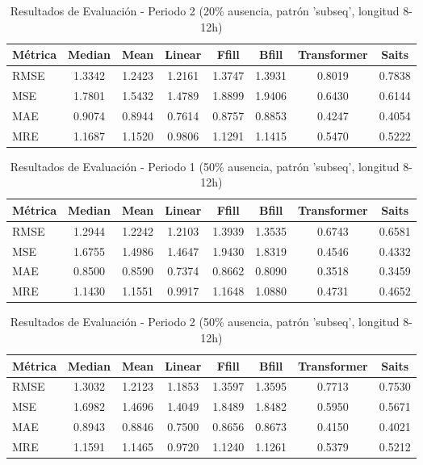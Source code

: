 \begin{table}[htbp]
\centering
\caption{Resultados de Evaluación - Periodo 2 (20\% ausencia, patrón 'subseq', longitud 8-12h)}
\label{tab:poqueira_20_subseq_per2}
\begin{tabular}{l*{7}{S[table-format=1.4]}}
\toprule
\textbf{Métrica} & \textbf{Median} & \textbf{Mean} & \textbf{Linear} & \textbf{Ffill} & \textbf{Bfill} & \textbf{Transformer} & \textbf{Saits} \\
\midrule
RMSE & 1.3342 & 1.2423 & 1.2161 & 1.3747 & 1.3931 & 0.8019 & 0.7838 \\
MSE  & 1.7801 & 1.5432 & 1.4789 & 1.8899 & 1.9406 & 0.6430 & 0.6144 \\
MAE  & 0.9074 & 0.8944 & 0.7614 & 0.8757 & 0.8853 & 0.4247 & 0.4054 \\
MRE  & 1.1687 & 1.1520 & 0.9806 & 1.1291 & 1.1415 & 0.5470 & 0.5222 \\
\bottomrule
\end{tabular}
\end{table}

\begin{table}[htbp]
\centering
\caption{Resultados de Evaluación - Periodo 1 (50\% ausencia, patrón 'subseq', longitud 8-12h)}
\label{tab:poqueira_50_subseq_per1}
\begin{tabular}{l*{7}{S[table-format=1.4]}}
\toprule
\textbf{Métrica} & \textbf{Median} & \textbf{Mean} & \textbf{Linear} & \textbf{Ffill} & \textbf{Bfill} & \textbf{Transformer} & \textbf{Saits} \\
\midrule
RMSE & 1.2944 & 1.2242 & 1.2103 & 1.3939 & 1.3535 & 0.6743 & 0.6581 \\
MSE  & 1.6755 & 1.4986 & 1.4647 & 1.9430 & 1.8319 & 0.4546 & 0.4332 \\
MAE  & 0.8500 & 0.8590 & 0.7374 & 0.8662 & 0.8090 & 0.3518 & 0.3459 \\
MRE  & 1.1430 & 1.1551 & 0.9917 & 1.1648 & 1.0880 & 0.4731 & 0.4652 \\
\bottomrule
\end{tabular}
\end{table}

\begin{table}[htbp]
\centering
\caption{Resultados de Evaluación - Periodo 2 (50\% ausencia, patrón 'subseq', longitud 8-12h)}
\label{tab:poqueira_50_subseq_per2}
\begin{tabular}{l*{7}{S[table-format=1.4]}}
\toprule
\textbf{Métrica} & \textbf{Median} & \textbf{Mean} & \textbf{Linear} & \textbf{Ffill} & \textbf{Bfill} & \textbf{Transformer} & \textbf{Saits} \\
\midrule
RMSE & 1.3032 & 1.2123 & 1.1853 & 1.3597 & 1.3595 & 0.7713 & 0.7530 \\
MSE  & 1.6982 & 1.4696 & 1.4049 & 1.8489 & 1.8482 & 0.5950 & 0.5671 \\
MAE  & 0.8943 & 0.8846 & 0.7500 & 0.8656 & 0.8673 & 0.4150 & 0.4021 \\
MRE  & 1.1591 & 1.1465 & 0.9720 & 1.1240 & 1.1261 & 0.5379 & 0.5212 \\
\bottomrule
\end{tabular}
\end{table}

